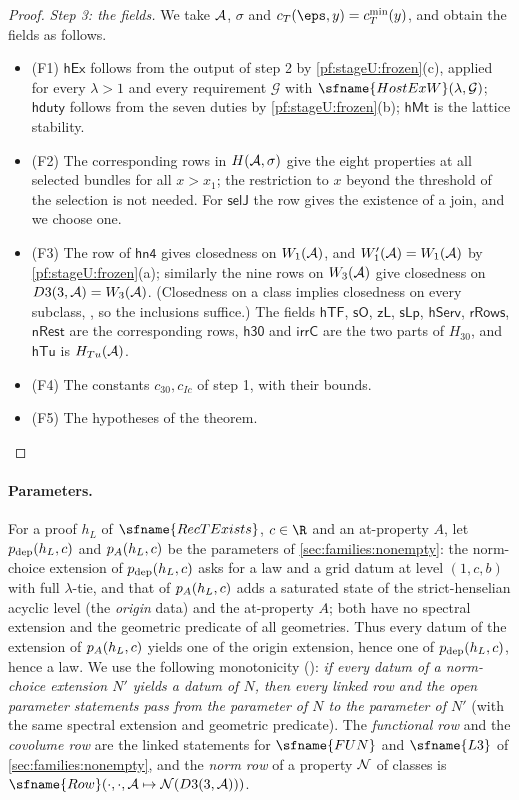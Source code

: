 \begin{proof}
\emph{Step 3: the fields.} We take $\mathcal{A}$, $\sigma$ and $c_T(\eps,y)=c_T^{\min}(y)$, and obtain the fields as follows.
\begin{itemize}
\item (F1) $\mathsf{hEx}$ follows from the output of step 2 by \cref{pf:stageU:frozen}(c), applied for every $\lambda>1$ and
every requirement $\mathcal G$ with $\sfname{HostExW}(\lambda,\mathcal G)$; $\mathsf{hduty}$ follows from the seven duties
by \cref{pf:stageU:frozen}(b); $\mathsf{hMt}$ is the lattice stability.
\item (F2) The corresponding rows in $H(\mathcal{A},\sigma)$ give the eight properties at all selected bundles for all $x>x_1$;
the restriction to $x$ beyond the threshold of the selection is not needed. For $\mathsf{selJ}$ the row gives the
existence of a join, and we choose one.
\item (F3) The row of $\mathsf{hn4}$ gives closedness on $W_1(\mathcal{A})$, and $W'_1(\mathcal{A})=W_1(\mathcal{A})$ by
\cref{pf:stageU:frozen}(a); similarly the nine rows on $W_3(\mathcal{A})$ give closedness on $D3(3,\mathcal{A})=W_3(\mathcal{A})$.
(Closedness on a class implies closedness on every subclass, , so the
inclusions suffice.) The fields $\mathsf{hTF}$, $\mathsf{sO}$, $\mathsf{zL}$, $\mathsf{sLp}$, $\mathsf{hServ}$, $\mathsf{rRows}$,
$\mathsf{nRest}$ are the corresponding rows, $\mathsf{h30}$ and $\mathsf{irrC}$ are the two parts of $H_{30}$, and
$\mathsf{hTu}$ is $H_{Tu}(\mathcal{A})$.
\item (F4) The constants $c_{30},c_{Ic}$ of step 1, with their bounds.
\item (F5) The hypotheses of the theorem.
\end{itemize}
\end{proof}

\paragraph{Parameters.}
For a proof $h_L$ of $\sfname{RecTExists}$, $c\in\R$ and an at-property $A$, let $p_{\mathrm{dep}}(h_L,c)$ and $p_{A}(h_L,c)$ be
the parameters of \cref{sec:families:nonempty}: the norm-choice extension of $p_{\mathrm{dep}}(h_L,c)$ asks for a law and a grid
datum at level $(1,c,b)$ with full $\lambda$-tie, and that of $p_{A}(h_L,c)$ adds a saturated state of the strict-henselian
acyclic level (the \emph{origin} data) and the at-property $A$; both have no spectral extension and the geometric predicate
of all geometries. Thus every datum of the extension of $p_{A}(h_L,c)$ yields one of the origin extension, hence one of
$p_{\mathrm{dep}}(h_L,c)$, hence a law. We use the following monotonicity
(): \emph{if every datum of a norm-choice extension
$N'$ yields a datum of $N$, then every linked row and the open parameter statements pass from the parameter of $N$ to the
parameter of $N'$} (with the same spectral extension and geometric predicate). The \emph{functional row} and the
\emph{covolume row} are the linked statements for $\sfname{FUN}$ and $\sfname{L3}$ of \cref{sec:families:nonempty}, and
the \emph{norm row} of a property $\mathcal{N}$ of classes is $\sfname{Row}(\cdot,\cdot,\stageUA\mapsto\stageUNN(D3(3,\stageUA)))$.

